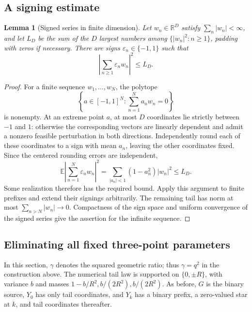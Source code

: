 \documentclass[11pt,letterpaper]{amsart}
\newtheorem{lemma}[theorem]{Lemma}
\theoremstyle{definition}
\theoremstyle{remark}
\numberwithin{equation}{section}
\begin{document}
\subsection{A signing estimate}

\begin{lemma}[Signed series in finite dimension]\label{enc:signed}
Let $w_n\in\mathbb R^D$ satisfy $\sum_n|w_n|<\infty$, and let
$L_D$ be the sum of the $D$ largest numbers among
$\{|w_n|^2:n\ge1\}$, padding with zeros if necessary.
There are signs $\varepsilon_n\in\{-1,1\}$ such that
\[
 \left|\sum_{n\ge1}\varepsilon_nw_n\right|^2\le L_D.
\]
\end{lemma}
\begin{proof}
For a finite sequence $w_1,\ldots,w_N$, the polytope
\[
 \left\{a\in[-1,1]^N:\sum_{n=1}^N a_nw_n=0\right\}
\]
is nonempty. At an extreme point $a$, at most $D$ coordinates
lie strictly between $-1$ and $1$: otherwise the corresponding
vectors are linearly dependent and admit a nonzero feasible
perturbation in both directions. Independently round each of
these coordinates to a sign with mean $a_n$, leaving the other
coordinates fixed. Since the centered rounding errors are
independent,
\[
 \mathbb E\left|\sum_{n=1}^N\varepsilon_nw_n\right|^2
 =\sum_{|a_n|<1}(1-a_n^2)|w_n|^2\le L_D.
\]
Some realization therefore has the required bound. Apply this
argument to finite prefixes and extend their signings arbitrarily.
The remaining tail has norm at most $\sum_{n>N}|w_n|\to0$.
Compactness of the sign space and uniform convergence of the
signed series give the assertion for the infinite sequence.
\end{proof}

\subsection{Eliminating all fixed three-point parameters}

In this section, $\gamma$ denotes the squared geometric ratio;
thus $\gamma=q^2$ in the construction above. The numerical tail
law is supported on $\{0,\pm R\}$, with variance $b$ and masses
$1-b/R^2,b/(2R^2),b/(2R^2)$. As before, $G$ is the binary source,
$Y_0$ has only tail coordinates, and $Y_k$ has a binary prefix,
a zero-valued star at $k$, and tail coordinates thereafter.
\end{document}
